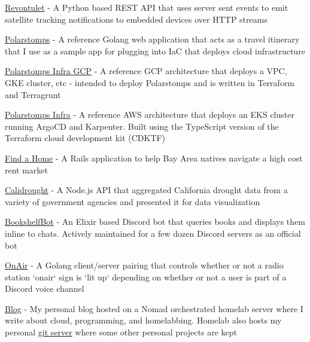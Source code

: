 \begin{cventries}
  \cventry
    {}
    {}
    {}
    {}
    {
      \begin{cvitems}
        \item
          {\href{https://github.com/howdoicomputer/revontulet}{Revontulet} - A Python based REST API that uses server sent events to emit satellite tracking notifications to embedded devices over HTTP streams}
        \item {\href{https://github.com/howdoicomputer/polarstomps}{Polarstomps} - A reference Golang web application that acts as a travel itinerary that I use as a sample app for plugging into IaC that deploys cloud infrastructure}
        \item
          {\href{https://github.com/polarstomps-infra-gcp}{Polarstomps Infra GCP} - A reference GCP architecture that deploys a VPC, GKE cluster, etc - intended to deploy Polarstomps and is written in Terraform and Terragrunt}
        \item
          {\href{https://github.com/howdoicomputer/polarstomps-infra}{Polarstomps Infra} - A reference AWS architecture that deploys an EKS cluster running ArgoCD and Karpenter. Built using the TypeScript version of the Terraform cloud development kit (CDKTF)}
        \item {\href{https://github.com/codeforsanjose/findahome}{Find a Home} - A Rails application to help Bay Area natives navigate a high cost rent market}
        \item
        {\href{https://github.com/codeforsanjose/calidrought-legacy}{Calidrought} - A Node.js API that aggregated California drought data from a variety of government agencies and presented it for data visualization}
        \item
        {\href{https://github.com/howdoicomputer/bookshelfbot}{BookshelfBot} - An Elixir based Discord bot that queries books and displays them inline to chats. Actively maintained for a few dozen Discord servers as an official bot}
        \item
        {\href{https://github.com/howdoicomputer/onair}{OnAir} - A Golang client/server pairing that controls whether or not a radio station `onair` sign is `lit up` depending on whether or not a user is part of a Discord voice channel}
        \item
        {\href{https://howdoicomputer.lol}{Blog} - My personal blog hosted on a Nomad orchestrated homelab server where I write about cloud, programming, and homelabbing. Homelab also hosts my personal \href{https://git.howdoicomputer.lol/}{git server} where some other personal projects are kept}
      \end{cvitems}
    }
\end{cventries}

